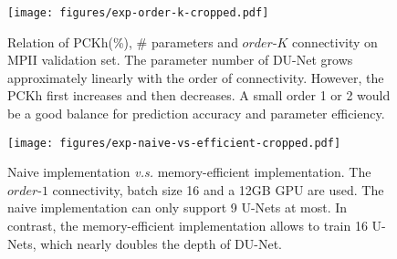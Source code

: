 \documentclass[runningheads]{llncs}
\begin{document}
\begin{figure}[t]
\centering
  \texttt{[image: figures/exp-order-k-cropped.pdf]}
\caption{Relation of PCKh(\%), \# parameters and $order$-$K$ connectivity on MPII validation set. The parameter number of DU-Net grows approximately linearly with the order of connectivity. However, the PCKh first increases and then decreases. A small order 1 or 2 would be a good balance for prediction accuracy and parameter efficiency.}
\label{fig:exp-order-k}
\endminipage \hfill
{}
\centering
  \texttt{[image: figures/exp-naive-vs-efficient-cropped.pdf]}
\caption{Naive implementation {\it v.s.} memory-efficient implementation. The $order$-$1$ connectivity, batch size 16 and a 12GB GPU are used. The naive implementation can only support 9 U-Nets at most. In contrast, the memory-efficient implementation allows to train 16 U-Nets, which nearly doubles the depth of DU-Net.}
  \label{fig:exp-naive-vs-efficient} \hfill
\endminipage
\end{figure}
\end{document}
